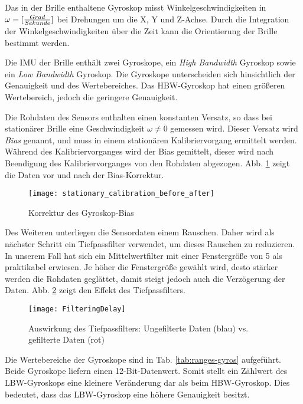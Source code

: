 Das in der Brille enthaltene Gyroskop misst Winkelgeschwindigkeiten in
$\omega = [{Grad \over Sekunde}]$ bei Drehungen um die X, Y und Z-Achse. Durch
die Integration der Winkelgeschwindigkeiten über die Zeit kann die
Orientierung der Brille bestimmt werden.  

Die \ac{IMU} der Brille enthält zwei
Gyroskope, ein \emph{High Bandwidth} Gyroskop sowie ein
\emph{Low Bandwidth} Gyroskop. Die Gyroskope unterscheiden sich
hinsichtlich der Genauigkeit und des Wertebereiches. Das \ac{HBW}-Gyroskop
hat einen größeren Wertebereich, jedoch die geringere
Genauigkeit.

Die Rohdaten des Sensors enthalten einen konstanten Versatz, so dass bei
stationärer Brille eine Geschwindigkeit $\omega \neq 0$ gemessen wird. Dieser
Versatz wird \emph{Bias} genannt, und muss in einem stationären
Kalibriervorgang ermittelt werden. Während des Kalibriervorganges wird
der Bias gemittelt, dieser wird nach Beendigung des Kalibriervorganges von den
Rohdaten abgezogen. Abb. \ref{fig:gyro_bias} zeigt die Daten vor und nach der
Bias-Korrektur.

\begin{figure}[h]
   \centering
   \texttt{[image: stationary\_calibration\_before\_after]}
   \caption{Korrektur des Gyroskop-Bias}
   \label{fig:gyro_bias}
\end{figure}

Des Weiteren unterliegen die Sensordaten einem Rauschen. Daher wird als
nächster Schritt ein Tiefpassfilter verwendet, um dieses Rauschen zu
reduzieren. In unserem Fall hat sich ein Mittelwertfilter mit einer 
Fenstergröße von 5 als praktikabel erwiesen. Je höher die Fenstergröße gewählt wird,
desto stärker werden die Rohdaten geglättet, damit steigt jedoch auch
die Verzögerung der Daten. Abb. \ref{fig:lowpass-delay} zeigt den Effekt des Tiefpassfilters.

\begin{figure}[h]
   \centering
   \texttt{[image: FilteringDelay]}
   \caption{Auswirkung des Tiefpassfilters: Ungefilterte Daten (blau) vs. gefilterte Daten (rot)}
   \label{fig:lowpass-delay}
\end{figure}

Die Wertebereiche der Gyroskope sind
in Tab. \ref{tab:ranges-gyros} aufgeführt. Beide Gyroskope liefern
einen 12-Bit-Datenwert. Somit stellt ein Zählwert des \ac{LBW}-Gyroskops eine
kleinere Veränderung dar als beim \ac{HBW}-Gyroskop.
Dies bedeutet, dass das \ac{LBW}-Gyroskop eine höhere Genauigkeit besitzt.

